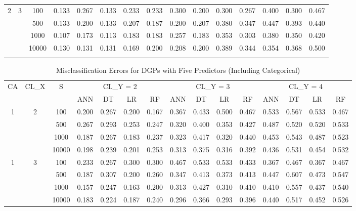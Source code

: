 \documentclass[12pt]{article}
\begin{document}
{\begin{longtable}{ccccccccccccccc}
    \hline
    2 & 3 & 100 & 0.133 & 0.267 & 0.133 & 0.233 & 0.233 & 0.300 & 0.200 & 0.300 & 0.267 & 0.400 & 0.300 & 0.467 \\
      &   & 500 & 0.133 & 0.200 & 0.133 & 0.207 & 0.187 & 0.200 & 0.207 & 0.380 & 0.347 & 0.447 & 0.393 & 0.440 \\
      &   & 1000 & 0.107 & 0.173 & 0.113 & 0.183 & 0.183 & 0.257 & 0.183 & 0.353 & 0.303 & 0.380 & 0.350 & 0.420 \\
      &   & 10000 & 0.130 & 0.131 & 0.131 & 0.169 & 0.200 & 0.208 & 0.200 & 0.389 & 0.344 & 0.354 & 0.368 & 0.500 \\
    \hline
    \label{tab:misclassification_errors}
\end{longtable}
}


{\small
\setlength{\tabcolsep}{3pt}
\renewcommand{\arraystretch}{1}
\begin{longtable}{ccccccccccccccc}
    \caption{\normalsize{Misclassification Errors for DGPs with Five Predictors (Including Categorical)}} \\
    \hline
    CA & CL\_X & S & \multicolumn{4}{c}{CL\_Y = 2} & \multicolumn{4}{c}{CL\_Y = 3} & \multicolumn{4}{c}{CL\_Y = 4} \\
    \cline{4-15}
    & & & ANN & DT & LR & RF & ANN & DT & LR & RF & ANN & DT & LR & RF \\
    \hline
    1 & 2 & 100 & 0.200 & 0.267 & 0.200 & 0.167 & 0.367 & 0.433 & 0.500 & 0.467 & 0.533 & 0.567 & 0.533 & 0.467 \\
      &   & 500 & 0.267 & 0.293 & 0.253 & 0.247 & 0.320 & 0.400 & 0.353 & 0.427 & 0.487 & 0.520 & 0.520 & 0.533 \\
      &   & 1000 & 0.187 & 0.267 & 0.183 & 0.237 & 0.323 & 0.417 & 0.320 & 0.440 & 0.453 & 0.543 & 0.487 & 0.523 \\
      &   & 10000 & 0.198 & 0.239 & 0.201 & 0.253 & 0.313 & 0.375 & 0.316 & 0.392 & 0.436 & 0.531 & 0.454 & 0.532 \\
    \hline
    1 & 3 & 100 & 0.233 & 0.267 & 0.300 & 0.300 & 0.467 & 0.533 & 0.533 & 0.433 & 0.367 & 0.467 & 0.367 & 0.467 \\
      &   & 500 & 0.187 & 0.307 & 0.200 & 0.260 & 0.347 & 0.413 & 0.373 & 0.413 & 0.447 & 0.607 & 0.473 & 0.547 \\
      &   & 1000 & 0.157 & 0.247 & 0.163 & 0.200 & 0.313 & 0.427 & 0.310 & 0.410 & 0.410 & 0.557 & 0.437 & 0.540 \\
      &   & 10000 & 0.183 & 0.224 & 0.187 & 0.240 & 0.296 & 0.366 & 0.293 & 0.396 & 0.440 & 0.517 & 0.452 & 0.526 \\

\end{longtable}}
\end{document}
